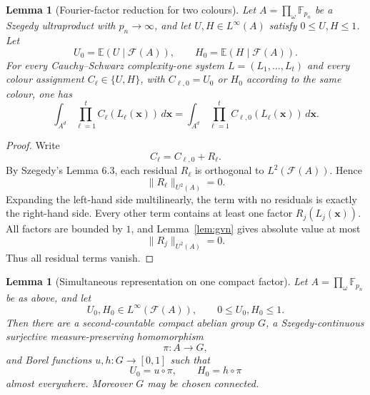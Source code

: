 \documentclass[11pt]{article}
\numberwithin{equation}{section}
\newtheorem{lemma}[theorem]{Lemma}
\newcommand{\E}{\mathbb E}
\newcommand{\F}{\mathbb F}
\newcommand{\1}{\mathbf 1}
\newcommand{\calF}{\mathcal F}
\begin{document}
\begin{lemma}[Fourier-factor reduction for two colours]
\label{lem:two-colour-factor-reduction}
Let \(A=\prod_\omega\F_{p_n}\) be a Szegedy ultraproduct with
\(p_n\to\infty\), and let \(U,H\in L^\infty(A)\) satisfy
\(0\le U,H\le1\).  Let
\[
        U_0=\E(U\mid\calF(A)),
        \qquad
        H_0=\E(H\mid\calF(A)).
\]
For every Cauchy--Schwarz complexity-one system
\(L=(L_1,\ldots,L_t)\) and every colour assignment
\(C_\ell\in\{U,H\}\), with \(C_{\ell,0}=U_0\) or \(H_0\) according to the
same colour, one has
\[
        \int_{A^d}\prod_{\ell=1}^t C_\ell(L_\ell(\mathbf x))\,d\mathbf x
        =
        \int_{A^d}\prod_{\ell=1}^t C_{\ell,0}(L_\ell(\mathbf x))\,d\mathbf x.
\]
\end{lemma}

\begin{proof}
Write
\[
        C_\ell=C_{\ell,0}+R_\ell.
\]
By Szegedy's Lemma 6.3, each residual \(R_\ell\) is orthogonal to
\(L^2(\calF(A))\).  Hence
\[
        \|R_\ell\|_{U^2(A)}=0.
\]
Expanding the left-hand side multilinearly, the term with no residuals is
exactly the right-hand side.  Every other term contains at least one factor
\(R_j(L_j(\mathbf x))\).  All factors are bounded by \(1\), and
Lemma~\ref{lem:gvn} gives absolute value at most
\[
        \|R_j\|_{U^2(A)}=0.
\]
Thus all residual terms vanish.
\end{proof}

\begin{lemma}[Simultaneous representation on one compact factor]
\label{lem:simultaneous-factor}
Let \(A=\prod_\omega\F_{p_n}\) be as above, and let
\[
        U_0,H_0\in L^\infty(\calF(A)),
        \qquad 0\le U_0,H_0\le1.
\]
Then there are a second-countable compact abelian group \(G\), a
Szegedy-continuous surjective measure-preserving homomorphism
\[
        \pi:A\to G,
\]
and Borel functions \(u,h:G\to[0,1]\) such that
\[
        U_0=u\circ\pi,
        \qquad
        H_0=h\circ\pi
\]
almost everywhere.  Moreover \(G\) may be chosen connected.
\end{lemma}
\end{document}
